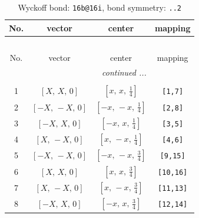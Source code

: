 \documentclass[fleqn,8pt]{jsarticle}
\begin{document}
\begin{longtable}{cccc}
\caption{Wyckoff bond: {\tt 16b@16i}, bond symmetry: {\tt ..2}}
 \\
 \hline \hline
No. & vector & center & mapping \\ \hline \endfirsthead

\multicolumn{3}{l}{\tablename\ \thetable{}} \\
 \hline \hline
No. & vector & center & mapping \\ \hline \endhead

 \hline \hline
\multicolumn{3}{r}{\footnotesize\it continued ...} \\ \endfoot

 \hline \hline
\multicolumn{3}{r}{} \\ \endlastfoot

1 & $\left[ X,\, X,\, 0 \right]$ & $\left[ x,\, x,\, \frac{1}{4} \right]$ & {\tt [1,7]} \\ \hline
2 & $\left[ - X,\, - X,\, 0 \right]$ & $\left[ - x,\, - x,\, \frac{1}{4} \right]$ & {\tt [2,8]} \\ \hline
3 & $\left[ - X,\, X,\, 0 \right]$ & $\left[ - x,\, x,\, \frac{1}{4} \right]$ & {\tt [3,5]} \\ \hline
4 & $\left[ X,\, - X,\, 0 \right]$ & $\left[ x,\, - x,\, \frac{1}{4} \right]$ & {\tt [4,6]} \\ \hline
5 & $\left[ - X,\, - X,\, 0 \right]$ & $\left[ - x,\, - x,\, \frac{3}{4} \right]$ & {\tt [9,15]} \\ \hline
6 & $\left[ X,\, X,\, 0 \right]$ & $\left[ x,\, x,\, \frac{3}{4} \right]$ & {\tt [10,16]} \\ \hline
7 & $\left[ X,\, - X,\, 0 \right]$ & $\left[ x,\, - x,\, \frac{3}{4} \right]$ & {\tt [11,13]} \\ \hline
8 & $\left[ - X,\, X,\, 0 \right]$ & $\left[ - x,\, x,\, \frac{3}{4} \right]$ & {\tt [12,14]} \\
\end{longtable}
\renewcommand{\arraystretch}{1.2}
\end{document}
